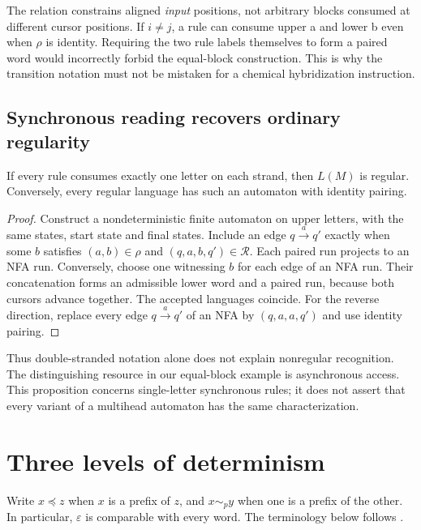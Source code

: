 The relation constrains aligned \emph{input} positions, not arbitrary blocks
consumed at different cursor positions. If $i\ne j$, a rule can consume
upper a and lower b even when $\rho$ is identity. Requiring the two rule
labels themselves to form a paired word would incorrectly forbid the
equal-block construction. This is why the transition notation must not be
mistaken for a chemical hybridization instruction.

\subsection{Synchronous reading recovers ordinary regularity}
\begin{proposition}
If every rule consumes exactly one letter on each strand, then $L(M)$ is
regular. Conversely, every regular language has such an automaton with
identity pairing.
\end{proposition}
\begin{proof}
Construct a nondeterministic finite automaton on upper letters, with the same
states, start state and final states. Include an edge $q\xrightarrow{a}q'$
exactly when some $b$ satisfies $(a,b)\in\rho$ and
$(q,a,b,q')\in\mathcal R$. Each paired run projects to an NFA run.
Conversely, choose one witnessing $b$ for each edge of an NFA run. Their
concatenation forms an admissible lower word and a paired run, because both
cursors advance together. The accepted languages coincide. For the reverse
direction, replace every edge $q\xrightarrow{a}q'$ of an NFA by
$(q,a,a,q')$ and use identity pairing.
\end{proof}
Thus double-stranded notation alone does not explain nonregular recognition.
The distinguishing resource in our equal-block example is asynchronous access.
This proposition concerns single-letter synchronous rules; it does not assert
that every variant of a multihead automaton has the same characterization.

\section{Three levels of determinism}
Write $x\preceq z$ when $x$ is a prefix of $z$, and $x\sim_p y$ when
one is a prefix of the other. In particular, $\varepsilon$ is comparable
with every word. The terminology below follows \cite{Czeizler2009}.

